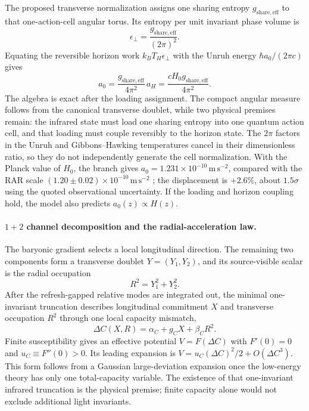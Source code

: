 \documentclass[11pt]{article}
\begin{document}
The proposed transverse normalization assigns one sharing entropy $g_{\mathrm{share,eff}}$ to that one-action-cell angular torus. Its entropy per unit invariant phase volume is
\[
\epsilon_\perp=\frac{g_{\mathrm{share,eff}}}{(2\pi)^2}.
\]
Equating the reversible horizon work $k_BT_H\epsilon_\perp$ with the Unruh energy $\hbar a_0/(2\pi c)$ \citep{Unruh1976} gives
\[
a_0=\frac{g_{\mathrm{share,eff}}}{4\pi^2}\,a_H=\frac{cH_0g_{\mathrm{share,eff}}}{4\pi^2}.
\]
The algebra is exact after the loading assignment. The compact angular measure follows from the canonical transverse doublet, while two physical premises remain: the infrared state must load one sharing entropy into one quantum action cell, and that loading must couple reversibly to the horizon state. The $2\pi$ factors in the Unruh and Gibbons--Hawking temperatures cancel in their dimensionless ratio, so they do not independently generate the cell normalization. With the Planck value of $H_0$, the branch gives $a_0=1.231\times10^{-10}\,\mathrm{m\,s^{-2}}$, compared with the RAR scale $(1.20\pm0.02)\times10^{-10}\,\mathrm{m\,s^{-2}}$ \citep{McGaugh2016,Planck2020}; the displacement is $+2.6\%$, about $1.5\sigma$ using the quoted observational uncertainty. If the loading and horizon coupling hold, the model also predicts $a_0(z)\propto H(z)$.

\paragraph{$1+2$ channel decomposition and the radial-acceleration law.}
The baryonic gradient selects a local longitudinal direction. The remaining two components form a transverse doublet $Y=(Y_1,Y_2)$, and its source-visible scalar is the radial occupation
\[
R^2=Y_1^2+Y_2^2.
\]
After the refresh-gapped relative modes are integrated out, the minimal one-invariant truncation describes longitudinal commitment $X$ and transverse occupation $R^2$ through one local capacity mismatch,
\[
\Delta C(X,R)=\alpha_C+g_CX+\beta_C R^2.
\]
Finite susceptibility gives an effective potential $V=F(\Delta C)$ with $F'(0)=0$ and $u_C\equiv F''(0)>0$. Its leading expansion is $V=u_C(\Delta C)^2/2+O(\Delta C^3)$. This form follows from a Gaussian large-deviation expansion once the low-energy theory has only one total-capacity variable. The existence of that one-invariant infrared truncation is the physical premise; finite capacity alone would not exclude additional light invariants.
\end{document}
